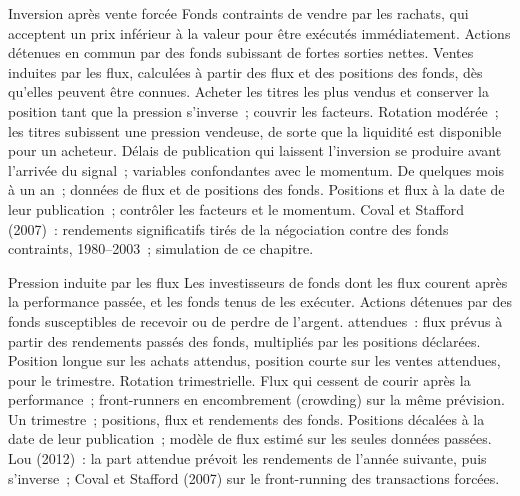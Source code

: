 \begin{strategyfile}{Inversion après vente forcée}\label{strat:s1:flows:firesale}
 Fonds contraints de vendre par les rachats, qui acceptent un prix inférieur à la valeur pour être exécutés immédiatement.
 Actions détenues en commun par des fonds subissant de fortes sorties nettes.
 Ventes induites par les flux, calculées à partir des flux et des positions des fonds, dès qu'elles peuvent être connues.
 Acheter les titres les plus vendus et conserver la position tant que la pression s'inverse~; couvrir les facteurs.
 Rotation modérée~; les titres subissent une pression vendeuse, de sorte que la liquidité est disponible pour un acheteur.
 Délais de publication qui laissent l'inversion se produire avant l'arrivée du signal~; variables confondantes avec le momentum.
 De quelques mois à un an~; données de flux et de positions des fonds.
 Positions et flux à la date de leur publication~; contrôler les facteurs et le momentum.
 Coval et Stafford (2007)~: rendements significatifs tirés de la négociation contre des fonds contraints, 1980--2003~; simulation de ce chapitre.
\end{strategyfile}

\begin{strategyfile}{Pression induite par les flux}\label{strat:s1:flows:pressure}
 Les investisseurs de fonds dont les flux courent après la performance passée, et les fonds tenus de les exécuter.
 Actions détenues par des fonds susceptibles de recevoir ou de perdre de l'argent.
  attendues~: flux prévus à partir des rendements passés des fonds, multipliés par les positions déclarées.
 Position longue sur les achats attendus, position courte sur les ventes attendues, pour le trimestre.
 Rotation trimestrielle.
 Flux qui cessent de courir après la performance~; front-runners en encombrement (crowding) sur la même prévision.
 Un trimestre~; positions, flux et rendements des fonds.
 Positions décalées à la date de leur publication~; modèle de flux estimé sur les seules données passées.
 Lou (2012)~: la part attendue prévoit les rendements de l'année suivante, puis s'inverse~; Coval et Stafford (2007) sur le front-running des transactions forcées.
\end{strategyfile}

